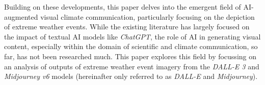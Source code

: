 Building on these developments, this paper delves into the emergent field of AI-augmented visual climate communication, particularly focusing on the depiction of extreme weather events. While the existing literature has largely focused on the impact of textual AI models like \textit{ChatGPT}, the role of AI in generating visual content, especially within the domain of scientific and climate communication, so far, has not been researched much. This paper explores this field by focussing on an analysis of outputs of extreme weather event imagery  from the \textit{DALL-E 3} and \textit{Midjourney v6} models (hereinafter only referred to as \textit{DALL-E} and \textit{Midjourney}).

